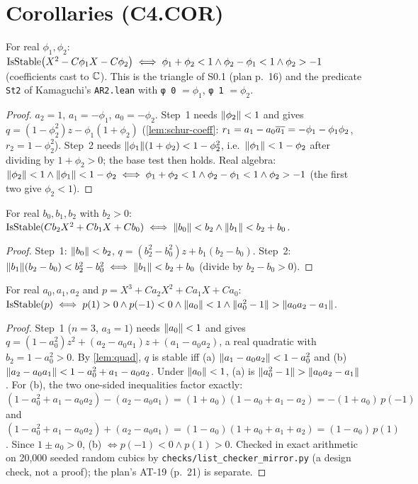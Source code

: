 \chapter{Corollaries (C4.COR)}

\begin{corollary}\label{cor:1}
For real $\phi_1,\phi_2$:
$\mathrm{IsStable}\big(X^2-C\phi_1X-C\phi_2\big)\iff\phi_1+\phi_2<1\wedge\phi_2-\phi_1<1\wedge\phi_2>-1$
(coefficients cast to $\mathbb{C}$). This is the triangle of S0.1 (plan p.~16) and the
predicate \texttt{St2} of Kamaguchi's \texttt{AR2.lean} with
\texttt{φ 0} $=\phi_1$, \texttt{φ 1} $=\phi_2$.
\end{corollary}
\begin{proof}
$a_2=1$, $a_1=-\phi_1$, $a_0=-\phi_2$. Step~1 needs $\lVert \phi_2 \rVert<1$ and gives
$q=(1-\phi_2^2)z-\phi_1(1+\phi_2)$ (\ref{lem:schur-coeff}:
$r_1=a_1-a_0\overline{a_1}=-\phi_1-\phi_1\phi_2$, $r_2=1-\phi_2^2$). Step~2 needs
$\lVert \phi_1 \rVert(1+\phi_2)<1-\phi_2^2$, i.e.\ $\lVert \phi_1 \rVert<1-\phi_2$ after dividing
by $1+\phi_2>0$; the base test then holds. Real algebra: $\lVert \phi_2 \rVert<1\wedge
\lVert \phi_1 \rVert<1-\phi_2\iff\phi_1+\phi_2<1\wedge\phi_2-\phi_1<1\wedge\phi_2>-1$
(the first two give $\phi_2<1$).
\end{proof}

\begin{lemma}\label{lem:quad}
For real $b_0,b_1,b_2$ with $b_2>0$:
$\mathrm{IsStable}(Cb_2X^2+Cb_1X+Cb_0)\iff\lVert b_0 \rVert<b_2\wedge\lVert b_1 \rVert<b_2+b_0$.
\end{lemma}
\begin{proof}
Step~1: $\lVert b_0 \rVert<b_2$, $q=(b_2^2-b_0^2)z+b_1(b_2-b_0)$. Step~2:
$\lVert b_1 \rVert(b_2-b_0)<b_2^2-b_0^2\iff\lVert b_1 \rVert<b_2+b_0$ (divide by $b_2-b_0>0$).
\end{proof}

\begin{corollary}\label{cor:2}
For real $a_0,a_1,a_2$ and $p=X^3+Ca_2X^2+Ca_1X+Ca_0$: $\mathrm{IsStable}(p)\iff
p(1)>0\wedge p(-1)<0\wedge\lVert a_0 \rVert<1\wedge\lVert a_0^2-1 \rVert>\lVert a_0a_2-a_1 \rVert$.
\end{corollary}
\begin{proof}
Step~1 ($n=3$, $a_3=1$) needs $\lVert a_0 \rVert<1$ and gives
$q=(1-a_0^2)z^2+(a_2-a_0a_1)z+(a_1-a_0a_2)$, a real quadratic with
$b_2=1-a_0^2>0$. By \ref{lem:quad}, $q$ is stable iff (a)
$\lVert a_1-a_0a_2 \rVert<1-a_0^2$ and (b) $\lVert a_2-a_0a_1 \rVert<1-a_0^2+a_1-a_0a_2$. Under
$\lVert a_0 \rVert<1$, (a) is $\lVert a_0^2-1 \rVert>\lVert a_0a_2-a_1 \rVert$. For (b), the two one-sided
inequalities factor exactly:
$(1-a_0^2+a_1-a_0a_2)-(a_2-a_0a_1)=(1+a_0)(1-a_0+a_1-a_2)=-(1+a_0)\,p(-1)$ and
$(1-a_0^2+a_1-a_0a_2)+(a_2-a_0a_1)=(1-a_0)(1+a_0+a_1+a_2)=(1-a_0)\,p(1)$.
Since $1\pm a_0>0$, (b) $\iff p(-1)<0\wedge p(1)>0$. Checked in exact
arithmetic on 20{,}000 seeded random cubics by \texttt{checks/list\_checker\_mirror.py}
(a design check, not a proof); the plan's AT-19 (p.~21) is separate.
\end{proof}

